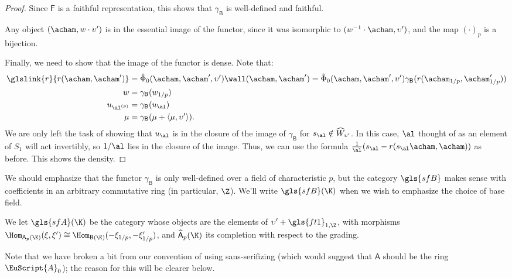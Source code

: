 \begin{proof}
Since $\mathsf{F}$ is a faithful representation, this shows that $\gamma_{\mathsf{B}}$ is well-defined and faithful.

Any object $(\acham, w\cdot \upsilon')$ is in the essential image of
the functor, since it was isomorphic to $(w^{-1}\cdot \acham,
\upsilon')$, and the map $(\cdot)_p$ is a bijection. 

Finally, we need to show that the image of the functor is dense.
Note that:   \begin{align*}
  \glslink{r}{r(\acham,\acham')}  &=\hat{\Phi}_0(\acham,\acham',\upsilon')\wall(\acham,\acham')=
                            \hat{\Phi}_0(\acham,\acham',\upsilon')\gamma_{\mathsf{B}}(r(\acham_{1/p},\acham'_{1/p}))\\
   w&=  \gamma_{\mathsf{B}} (w_{1/p})\\
   u_{\al^{(p)}}&=\gamma_{\mathsf{B}}(u_\al) \\
   \mu &=  \gamma_{\mathsf{B}}(\mu+\langle\mu,\upsilon'\rangle). 
  \end{align*}
We are only left the task of showing that $u_{\al}$ is
in the closure of the image of $\gamma_{\mathsf{B}}$ for $s_{\al}\notin \widehat{W}_{\upsilon'}$.  In this case, $\al$
thought of as an element of $S_1$ will act invertibly, so $1/\al$ lies in the closure of the image.   Thus, we can use the
formula $\frac{1}{\al}(s_{\al}-r(s_\al\acham,\acham))$ as before. This shows the density.
  \end{proof}


\begin{remark}\label{rem:coefficients}
  We should emphasize that the functor $\gamma_{\mathsf{B}}$ is only well-defined over a field of characteristic $p$, but the category $\gls{sfB}$  makes sense with coefficients in  an arbitrary commutative ring (in
  particular, $\Z$).  We'll write $\gls{sfB}(\K)$ when we wish to emphasize the choice of base field.  
\end{remark}


\begin{definition}\label{def:sfA}
  We let $\gls{sfA}(\K)$ be the category whose objects are 
 the elements of $\upsilon'+\gls{ft1}_{1,\Z}$, with morphisms 
 $\Hom_{ \mathsf{A}_p(\K)}(\xi,\xi')\cong
 \Hom_{\mathsf{B}(\K)}(-\xi_{1/p}, -\xi_{1/p}')$, and
 $\widehat{\mathsf{A}}_p (\K)$ its completion with respect to the grading. 
\end{definition}
 Note that we have broken a bit from our convention of using sans-serifizing (which would suggest that $\mathsf{A}$ should be the ring $\EuScript{A}_0$); the reason for this will be clearer below.

